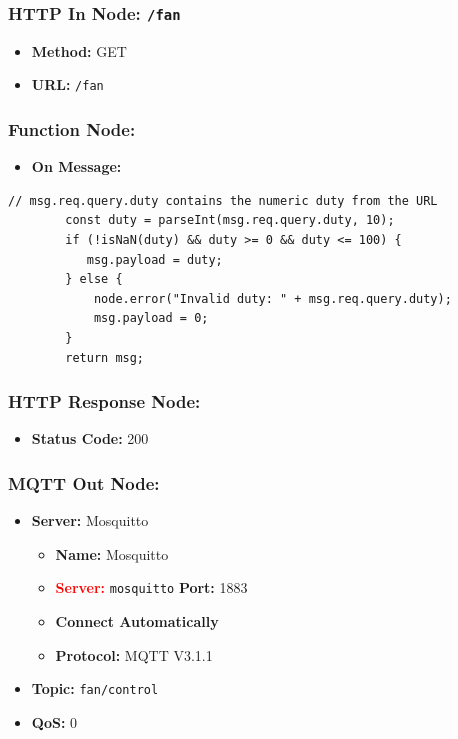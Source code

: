 \documentclass[onecolumn]{article}
\begin{document}
\subsubsection*{HTTP In Node: \texttt{/fan}}

\begin{itemize}
  \item \textbf{Method:} GET
  \item \textbf{URL:} \texttt{/fan}
\end{itemize}

\subsubsection*{Function Node:}

\begin{itemize}
  \item \textbf{On Message:}
\end{itemize}

\begin{lstlisting}[numbers=none]
        // msg.req.query.duty contains the numeric duty from the URL
        const duty = parseInt(msg.req.query.duty, 10);
        if (!isNaN(duty) && duty >= 0 && duty <= 100) {
           msg.payload = duty;
        } else {
            node.error("Invalid duty: " + msg.req.query.duty);
            msg.payload = 0;
        }
        return msg;
\end{lstlisting}

\subsubsection*{HTTP Response Node:}

\begin{itemize}
  \item \textbf{Status Code:} 200
\end{itemize}

\subsubsection*{MQTT Out Node:}

\begin{itemize}
  \item \textbf{Server:} Mosquitto
  \begin{itemize}
      \item \textbf{Name:} Mosquitto
      \item \textcolor{red}{\textbf{Server:}} \texttt{mosquitto}  \textbf{Port:} 1883
      \item \textbf{Connect Automatically}
      \item \textbf{Protocol:} MQTT V3.1.1
  \end{itemize}
  \item \textbf{Topic:} \texttt{fan/control}
  \item \textbf{QoS:} 0
\end{itemize}
\end{document}
